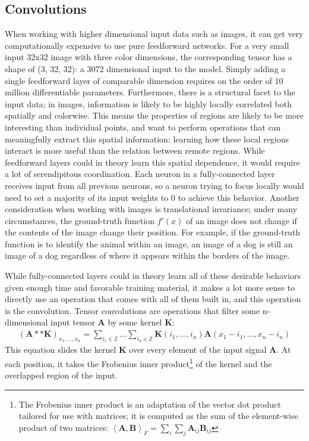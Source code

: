 \subsection{Convolutions}  \label{sect:conv}
When working with higher dimensional input data such as images, it can get very computationally expensive to use pure
feedforward networks. For a very small input 32x32 image with three color dimensions, the corresponding tensor has a shape of
(3, 32, 32): a 3072 dimensional input to the model. Simply adding a single feedforward layer of comparable dimension requires on the order of 10 million
differentiable parameters. Furthermore, there is a structural facet to the input data; in images,
information is likely to be highly locally correlated both spatially and colorwise. This means the
properties of regions are likely to be more interesting than individual points, and want to perform operations that can meaningfully extract this spatial
information: learning how these local regions interact is more useful than
the relation between remote regions. While feedforward layers could in theory learn this spatial dependence, it would require a lot of
serendipitous coordination.  Each neuron in a fully-connected layer receives input from all previous neurons,
so a neuron trying to focus locally would need to set a majority of its input weights to 0 to achieve this behavior.
Another consideration when working with images is translational invariance; under many circumstances,
the ground-truth function $f'(x)$ of an image does not change if the contents of the image change their position.
For example, if the ground-truth function is to identify the animal within an image, an image of a dog is still an image
of a dog regardless of where it appears within the borders of the image.

While fully-connected layers could in theory
learn all of these desirable behaviors given enough time and favorable training material, it makes a lot more sense
to directly use an operation that comes with all of them built in, and this operation is the convolution.
Tensor convolutions are operations that filter some n-dimensional input tensor $\mathbf{A}$ by some kernel $\mathbf{K}$:
\begin{align}
	(\mathbf{A} ** \mathbf{K})_{x_1,\dots,x_n} = \sum_{i_1\in\mathbb{Z}}\dots\sum_{i_n\in\mathbb{Z}} \mathbf{K}(i_1,\dots,i_n)\mathbf{A}(x_1-i_1,\dots,x_n-i_n)
\end{align}
\noindent This equation slides the kernel $\mathbf{K}$ over every element of the input signal $\mathbf{A}$.
At each position, it takes the Frobenius inner product\footnote{The Frobenius inner product is an adaptation of the vector
dot product tailored for use with matrices; it is computed as the sum of the element-wise product of two matrices:
	$\left<\mathbf{A},\mathbf{B}\right>_F = \sum_i \sum_j \mathbf{A}_{ij} \mathbf{B}_{ij}$}  of the kernel and the
overlapped region of the input.

